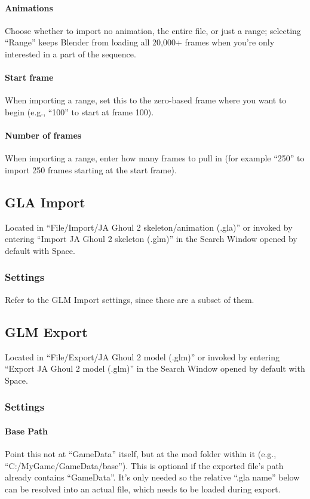 \documentclass[a4paper,10pt]{article}
\begin{document}
\paragraph*{Animations}
Choose whether to import no animation, the entire file, or just a range; selecting ``Range'' keeps Blender from
loading all 20,000+ frames when you're only interested in a part of the sequence.

\paragraph*{Start frame}
When importing a range, set this to the zero-based frame where you want to begin (e.g., ``100'' to start at frame 100).

\paragraph*{Number of frames}
When importing a range, enter how many frames to pull in (for example ``250'' to import 250 frames starting at the
start frame).
 
 
 \subsection{GLA Import}
 
 Located in ``File/Import/JA Ghoul 2 skeleton/animation (.gla)'' or invoked by entering ``Import JA Ghoul 2
 skeleton (.glm)'' in the Search Window opened by default with Space.
 
 \subsubsection*{Settings}
 
 Refer to the GLM Import settings, since these are a subset of them.
 
 
 \subsection{GLM Export}
 
 Located in ``File/Export/JA Ghoul 2 model (.glm)'' or invoked by entering ``Export JA Ghoul 2 model (.glm)''
 in the Search Window opened by default with Space.
 
 \subsubsection*{Settings}
 
\paragraph*{Base Path}
Point this not at ``GameData'' itself, but at the mod folder within it (e.g., ``C:/MyGame/GameData/base'').
This is optional if the exported file's path already contains ``GameData''. It's only needed so the relative
``.gla name'' below can be resolved into an actual file, which needs to be loaded during export.
\end{document}
